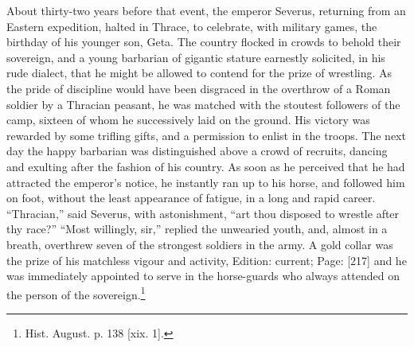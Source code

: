 About thirty-two years before that event, the emperor Severus, returning from an Eastern expedition, halted in Thrace, to celebrate, with military games, the birthday of his younger son, Geta. The country flocked in crowds to behold their sovereign, and a young barbarian of gigantic stature earnestly solicited, in his rude dialect, that he might be allowed to contend for the prize of wrestling. As the pride of discipline would have been disgraced in the overthrow of a Roman soldier by a Thracian peasant, he was matched with the stoutest followers of the camp, sixteen of whom he successively laid on the ground. His victory was rewarded by some trifling gifts, and a permission to enlist in the troops. The next day the happy barbarian was distinguished above a crowd of recruits, dancing and exulting after the fashion of his country. As soon as he perceived that he had attracted the emperor\texthebrew{}’s notice, he instantly ran up to his horse, and followed him on foot, without the least appearance of fatigue, in a long and rapid career. \texthebrew{“}Thracian,\texthebrew{}” said Severus, with astonishment, \texthebrew{“}art thou disposed to wrestle after thy race?\texthebrew{” “}Most willingly, sir,\texthebrew{}” replied the unwearied youth, and, almost in a breath, overthrew seven of the strongest soldiers in the army. A gold collar was the prize of his matchless vigour and activity, Edition: current; Page: [217] and he was immediately appointed to serve in the horse-guards who always attended on the person of the sovereign.\footnote{Hist. August. p. 138 [xix. 1].}


